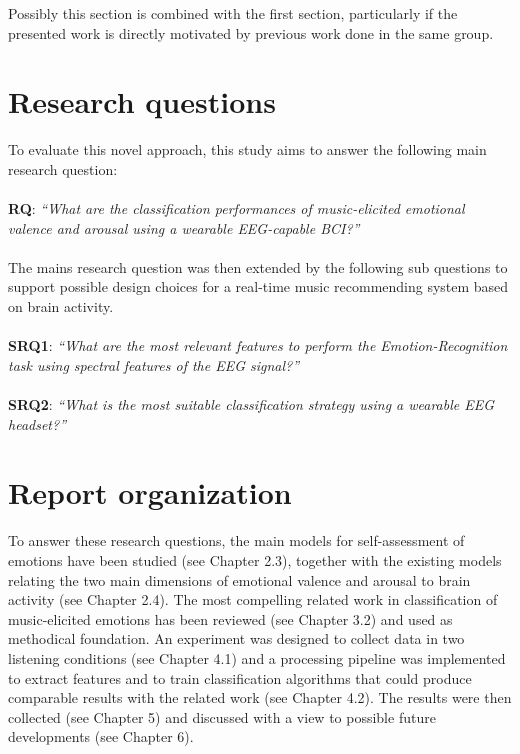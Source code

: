 Possibly this section is combined with the first section, particularly if the presented work is directly motivated by previous work done in the same group. 

\section{Research questions}
\label{sec:goal}
To evaluate this novel approach, this study aims to answer the following main research question:
\\
\\
\textbf{RQ}: \emph{ “What are the classification performances of music-elicited emotional valence and arousal using a wearable EEG-capable BCI?”}
\\
\\
The mains research question was then extended by the following sub questions to support possible design choices for a real-time music recommending system based on brain activity.
\\
\\
\textbf{SRQ1}: \emph{“What are the most relevant features to perform the Emotion-Recognition task using spectral features of the EEG signal?”}
\\
\\
\textbf{SRQ2}: \emph{“What is the most suitable classification strategy using a wearable EEG headset?”}



\section{Report organization}
\label{sec:organization}
To answer these research questions, the main models for self-assessment of emotions have been studied (see Chapter 2.3), together with the existing models relating the two main dimensions of emotional valence and arousal to brain activity (see Chapter 2.4). The most compelling related work in classification of music-elicited emotions has been reviewed (see Chapter 3.2) and used as methodical foundation. An experiment was designed to collect data in two listening conditions (see Chapter 4.1) and a processing pipeline was implemented to extract features and to train classification algorithms that could produce comparable results with the related work (see Chapter 4.2). The results were then collected (see Chapter 5) and discussed with a view to possible future developments (see Chapter 6).